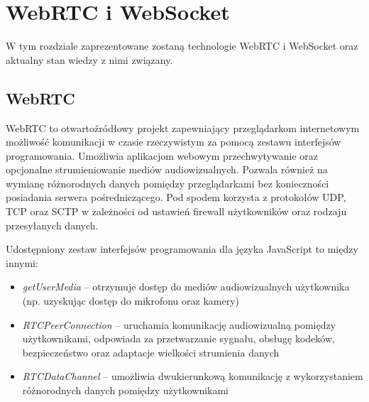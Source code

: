 \documentclass[language=polish,type=master]{aghmodern}
\begin{document}
\chapter{WebRTC i WebSocket}
W tym rozdziale zaprezentowane zostaną technologie WebRTC i WebSocket oraz aktualny stan wiedzy z nimi związany.

\section{WebRTC}
WebRTC to otwartoźródłowy projekt zapewniający przeglądarkom internetowym możliwość komunikacji w czasie rzeczywistym za pomocą zestawu interfejsów programowania.
Umożliwia aplikacjom webowym przechwytywanie oraz opcjonalne strumieniowanie mediów audiowizualnych.
Pozwala również na wymianę różnorodnych danych pomiędzy przeglądarkami bez konieczności posiadania serwera pośredniczącego.
Pod spodem korzysta z protokołów UDP, TCP oraz SCTP w zależności od ustawień firewall użytkowników oraz rodzaju przesyłanych danych.

Udostępniony zestaw interfejsów programowania dla języka JavaScript to między innymi:

\begin{itemize}
    \item \emph{getUserMedia} -- otrzymuje dostęp do mediów audiowizualnych użytkownika (np. uzyskując dostęp do mikrofonu oraz kamery)
    \item \emph{RTCPeerConnection} -- uruchamia komunikację audiowizualną pomiędzy użytkownikami, odpowiada za przetwarzanie sygnału, obsługę kodeków, bezpieczeństwo oraz adaptacje wielkości strumienia danych
    \item \emph{RTCDataChannel} -- umożliwia dwukierunkową komunikację z wykorzystaniem różnorodnych danych pomiędzy użytkownikami
\end{itemize}
\end{document}
